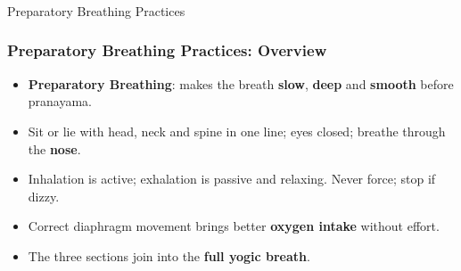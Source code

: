 


\begin{frame}[fragile]\frametitle{}
\begin{center}
{\Large Preparatory Breathing Practices }
\end{center}
\end{frame}

\begin{frame}[fragile]\frametitle{Preparatory Breathing Practices: Overview}
      \begin{itemize}
        \item \textbf{Preparatory Breathing}: makes the breath \textbf{slow}, \textbf{deep} and \textbf{smooth} before pranayama.
        \item Sit or lie with head, neck and spine in one line; eyes closed; breathe through the \textbf{nose}.
        \item Inhalation is active; exhalation is passive and relaxing. Never force; stop if dizzy.
        \item Correct diaphragm movement brings better \textbf{oxygen intake} without effort.
        \item The three sections join into the \textbf{full yogic breath}.
      \end{itemize}

\end{frame}

